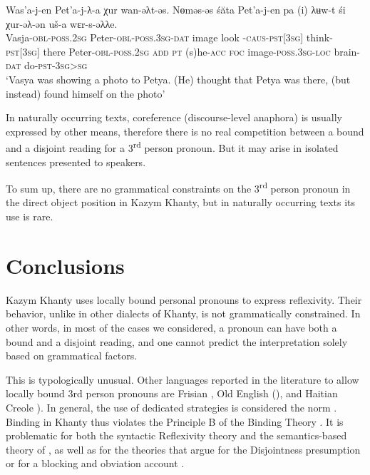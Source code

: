 \documentclass[output=paper]{langscibook}
\begin{document}
\ea 
\label{ex:Volkova:76}
 	\gll Was’a{}-j{}-en  Pet’a{}-j{}-λ{}-a  χur wan{}-əλt{}-əs. Nɵməs{}-əs \textup{ś}ăta Pet’a-j-en pa (i) λʉw-t śi χur-əλ-ən uš-a wɛr-s-əλλe.\\
 		Vasja\textsc{{}-obl-poss.2sg} Peter\textsc{{}-obl-poss.3sg-dat} image look			\textsc{{}-caus-pst[3sg]} think{}-\textsc{pst[3sg]} there Peter\textsc{{}-obl-poss.2sg add pt} (s)he\textsc{{}-acc foc} image\textsc{{}-poss.3sg-loc} brain\textsc{{}-dat} do\textsc{{}-pst-3sg>sg}\\
  	\glt ‘Vasya was showing a photo to Petya. (He) thought that Petya was there, (but instead) found himself on the photo’
\z


In naturally occurring texts, coreference (discourse-level anaphora) is usually expressed by other means, therefore there is no real competition between a bound and a disjoint reading for a 3\textsuperscript{rd} person pronoun. But it may arise in isolated sentences presented to speakers. 

To sum up, there are no grammatical constraints on the 3\textsuperscript{rd} person pronoun in the direct object position in Kazym Khanty, but in naturally occurring texts its use is rare.

\section{{Conclusions}}\label{sec:Volkova:9}

Kazym Khanty uses locally bound personal pronouns to express reflexivity. Their behavior, unlike in other dialects of Khanty, is not grammatically constrained. In other words, in most of the cases we considered, a pronoun can have both a bound and a disjoint reading, and one cannot predict the interpretation solely based on grammatical factors.

This is typologically unusual. Other languages reported in the literature to allow locally bound 3rd person pronouns are Frisian \citep{Everaert1986}, Old English (\citealt{Gelderen2000}), and Haitian Creole \citealt{Zribi-HertzGlaude2007}). In general, the use of dedicated strategies is considered the norm \citep{Moyse-Faurie2008,HeineMiyashita2008}. Binding in Khanty thus violates the Principle B of the Binding Theory \citep{Chomsky1981}. It is problematic for both the syntactic Reflexivity theory \citep{ReinhartReuland1993, Reuland2011} and the semantics-based theory of \citet{Schlenker2005}, as well as for the theories that argue for the Disjointness presumption \citep{FarmerHarnish1987,KoenigSiemund2000} or for a blocking and obviation account \citep{Kiparsky2012}.
\end{document}
